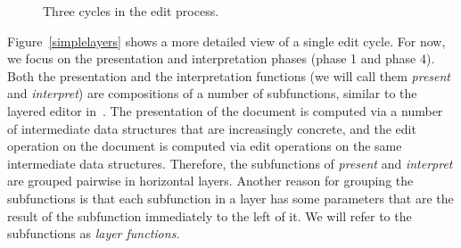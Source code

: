 \begin{figure}
\begin{small}
\begin{center}
\begin{center}
\begin{scriptsize}
\end{scriptsize}
\end{center}\caption{Three cycles in the edit process.}\label{simpleeditprocess} 
\end{center}
\end{small}
\end{figure}


 Figure~\ref{simplelayers}  shows a more detailed view of a single edit cycle. For now, we focus on the presentation and interpretation phases (phase 1 and phase 4). Both the presentation and the interpretation functions (we will call them {\em present} and {\em interpret}) are compositions of a number of subfunctions, similar to the layered editor in~\cite{architecture}. The presentation of the document is computed via a number of intermediate data structures that are increasingly concrete, and the edit operation on the document is computed via edit operations on the same intermediate data structures. Therefore, the subfunctions of {\em present} and {\em interpret} are grouped pairwise in horizontal layers. Another reason for grouping the subfunctions is that each subfunction in a layer has some parameters that are the result of the subfunction immediately to the left of it. We will refer to the subfunctions as {\em layer functions}.

